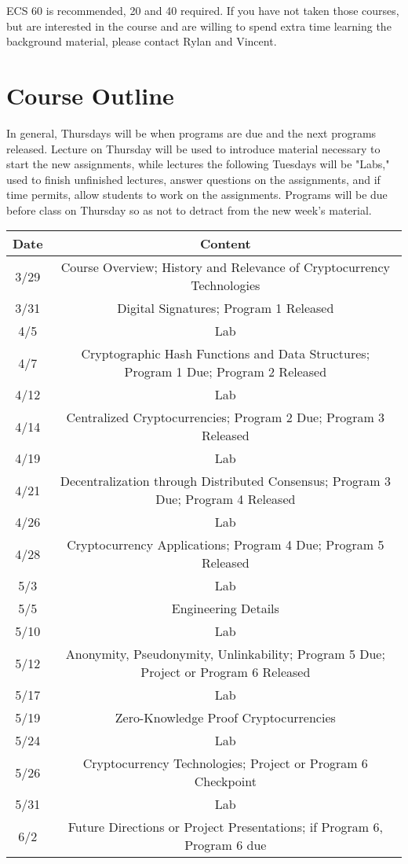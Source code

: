 \documentclass{article}
\begin{document}
ECS 60 is recommended, 20 and 40 required. If you have not taken those courses, but are interested in the course and are willing to spend extra time learning the background material, please contact Rylan and Vincent.

\pagebreak

\section*{Course Outline}

In general, Thursdays will be when programs are due and the next programs released. Lecture on Thursday will be used to introduce material necessary to start the new assignments, while lectures the following Tuesdays will be "Labs," used to finish unfinished lectures, answer questions on the assignments, and if time permits, allow students to work on the assignments. Programs will be due before class on Thursday so as not to detract from the new week's material.\newline

\begin{tabularx}{\textwidth}{c|c}
\hline
Date & Content\\
\hline
3/29 & Course Overview; History and Relevance of Cryptocurrency Technologies\\
3/31 & Digital Signatures; Program 1 Released\\
4/5 & Lab\\
4/7 & Cryptographic Hash Functions and Data Structures; Program 1 Due; Program 2 Released\\
4/12 & Lab\\
4/14 & Centralized Cryptocurrencies; Program 2 Due; Program 3 Released\\
4/19 & Lab\\
4/21 & Decentralization through Distributed Consensus; Program 3 Due; Program 4 Released\\
4/26 & Lab\\
4/28 & Cryptocurrency Applications; Program 4 Due; Program 5 Released\\
5/3 & Lab\\
5/5 & Engineering Details\\
5/10 & Lab\\
5/12 & Anonymity, Pseudonymity, Unlinkability; Program 5 Due; Project or Program 6 Released\\
5/17 & Lab\\
5/19 & Zero-Knowledge Proof Cryptocurrencies\\
5/24 & Lab\\
5/26 & Cryptocurrency Technologies; Project or Program 6 Checkpoint\\
5/31 & Lab\\
6/2 & Future Directions or Project Presentations; if Program 6, Program 6 due\\

\end{tabularx}
\end{document}
